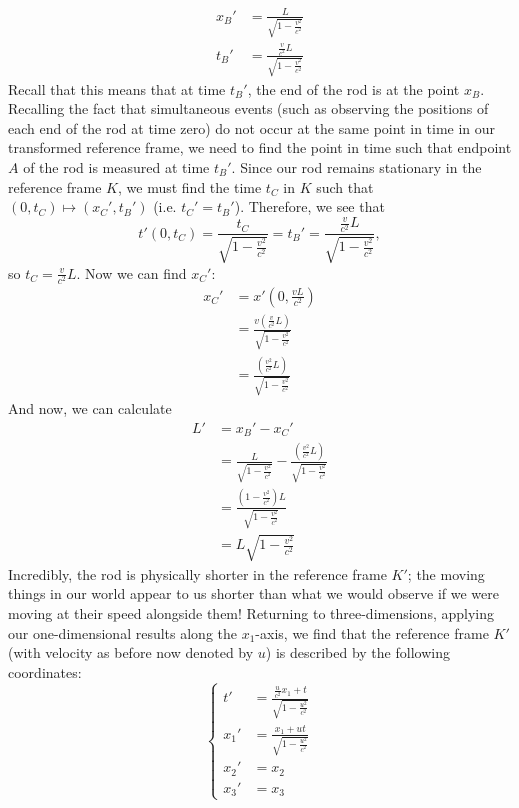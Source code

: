 \documentclass{article}
\newcommand{\nl}{\newline\newline\noindent}
\begin{document}
\begin{align*}
    x_B'&=\frac{L}{\sqrt{1-\frac{v^2}{c^2}}}\\
    t_B' &=\frac{\frac{v}{c^2}L}{\sqrt{1-\frac{v^2}{c^2}}}
\end{align*}
Recall that this means that at time $t_B'$, the end of the rod is at the point $x_B$. Recalling the fact that simultaneous events (such as observing the positions of each end of the rod at time zero) do not occur at the same point in time in our transformed reference frame, we need to find the point in time such that endpoint $A$ of the rod is measured at time $t_B'$. Since our rod remains stationary in the reference frame $K$, we must find the time $t_C$ in $K$ such that $(0,t_C)\mapsto (x_C', t_B')$ (i.e. $t_C'=t_B'$). Therefore, we see that
\[t'(0,t_C) = \frac{t_C}{\sqrt{1-\frac{v^2}{c^2}}} = t_B' = \frac{\frac{v}{c^2}L}{\sqrt{1-\frac{v^2}{c^2}}},\]
so $t_C = \frac{v}{c^2}L$. Now we can find $x_C'$:
\begin{align*}
    x_C'&= x'\left(0,\frac{vL}{c^2}\right)\\
        &= \frac{v\left(\frac{v}{c^2}L\right)}{\sqrt{1-\frac{v^2}{c^2}}}\\
        &= \frac{\left(\frac{v^2}{c^2}L\right)}{\sqrt{1-\frac{v^2}{c^2}}}
\end{align*}
And now, we can calculate
\begin{align*}
    L' &= x_B' - x_C'\\
    &= \frac{L}{\sqrt{1-\frac{v^2}{c^2}}} - \frac{\left(\frac{v^2}{c^2}L\right)}{\sqrt{1-\frac{v^2}{c^2}}}\\
    &= \frac{\left(1-\frac{v^2}{c^2}\right)L}{\sqrt{1-\frac{v^2}{c^2}}}\\
    &= L\sqrt{1-\frac{v^2}{c^2}}
\end{align*}
Incredibly, the rod is physically shorter in the reference frame $K'$; the moving things in our world appear to us shorter than what we would observe if we were moving at their speed alongside them!
\nl
Returning to three-dimensions, applying our one-dimensional results along the $x_1$-axis, we find that the reference frame $K'$ (with velocity as before now denoted by $u$) is described by the following coordinates:
\[\left\{\begin{aligned}
    t'&=\frac{\frac{u}{c^2}x_1 + t}{\sqrt{1-\frac{u^2}{c^2}}}\\
    x_1'&=\frac{x_1+ ut}{\sqrt{1-\frac{u^2}{c^2}}}\\
    x_2'&= x_2\\
    x_3'&= x_3
\end{aligned}\right.\]
\end{document}
